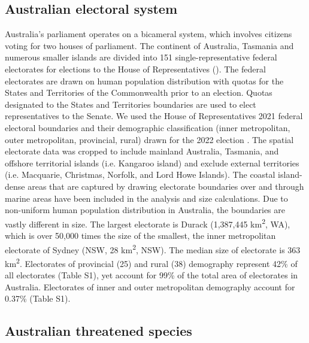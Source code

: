 \documentclass[a4paper,11pt]{article}
\begin{document}
\subsection{Australian electoral system}

Australia's parliament operates on a bicameral system, which involves citizens voting for two houses of parliament. The continent of Australia, Tasmania and numerous smaller islands are divided into 151 single-representative federal electorates for elections to the House of Representatives (\cite{parliamentofaustraliaElectoralDivisions2018}). The federal electorates are drawn on human population distribution with quotas for the States and Territories of the Commonwealth prior to an election. Quotas designated to the States and Territories boundaries are used to elect representatives to the Senate. We used the House of Representatives 2021 federal electoral boundaries and their demographic classification (inner metropolitan, outer metropolitan, provincial, rural) drawn for the 2022 election \cite{australiaelectoralcomissionFederalElectoralBoundaries2019}. The spatial electorate data was cropped to include mainland Australia, Tasmania, and offshore territorial islands (i.e. Kangaroo island) and exclude external territories (i.e. Macquarie, Christmas, Norfolk, and Lord Howe Islands). The coastal island-dense areas that are captured by drawing electorate boundaries over and through marine areas have been included in the analysis and size calculations. Due to non-uniform human population distribution in Australia, the boundaries are vastly different in size. The largest electorate is Durack (1,387,445 km\textsuperscript{2}, WA), which is over 50,000 times the size of the smallest, the inner metropolitan electorate of Sydney (NSW, 28 km\textsuperscript{2}, NSW). The median size of electorate is 363 km\textsuperscript{2}. Electorates of provincial (25) and rural (38) demography represent 42\% of all electorates (Table S1), yet account for 99\% of the total area of electorates in Australia. Electorates of inner and outer metropolitan demography account for 0.37\% (Table S1).

\subsection{Australian threatened species}
\end{document}

